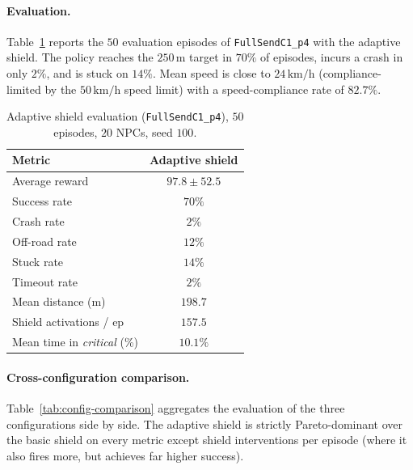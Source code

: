 \paragraph{Evaluation.}
Table~\ref{tab:adaptive-eval} reports the \(50\) evaluation episodes of
\texttt{FullSendC1\_p4} with the adaptive shield. The policy reaches the \(250\,\mathrm{m}\)
target in \(70\%\) of episodes, incurs a crash in only \(2\%\), and is stuck
on \(14\%\). Mean speed is close to \(24\,\mathrm{km/h}\) (compliance-limited by the
\(50\,\mathrm{km/h}\) speed limit) with a speed-compliance rate of \(82.7\%\).

\begin{table}[H]
  \centering
  \caption{Adaptive shield evaluation (\texttt{FullSendC1\_p4}), \(50\) episodes,
           \(20\) NPCs, seed \(100\).}
  \label{tab:adaptive-eval}
  \small
  \begin{tabular}{@{}lc@{}}
    \toprule
    \textbf{Metric} & \textbf{Adaptive shield} \\
    \midrule
    Average reward                       & $97.8 \pm 52.5$ \\
    Success rate                         & $70\%$ \\
    Crash rate                           & $2\%$ \\
    Off-road rate                        & $12\%$ \\
    Stuck rate                           & $14\%$ \\
    Timeout rate                         & $2\%$ \\
    Mean distance (m)                    & $198.7$ \\
    Shield activations / ep              & $157.5$ \\
    Mean time in \emph{critical} (\%)    & $10.1\%$ \\
    \bottomrule
  \end{tabular}
\end{table}

\paragraph{Cross-configuration comparison.}
Table~\ref{tab:config-comparison} aggregates the evaluation of the three configurations
side by side. The adaptive shield is strictly Pareto-dominant over the basic shield on
every metric except shield interventions per episode (where it also fires more, but
achieves far higher success).

